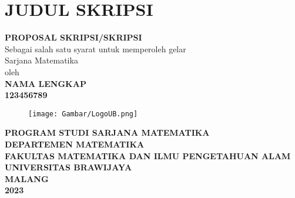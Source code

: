 
\chapter*{JUDUL SKRIPSI}
\begin{center}
	\vspace{1.0cm}
	{\textbf{PROPOSAL SKRIPSI/SKRIPSI{\huge}}}\\
	\vspace{0.5cm}
	Sebagai salah satu syarat untuk memperoleh gelar\\Sarjana Matematika\\
	\vspace{0.5cm}
	oleh\\
	\textbf{NAMA LENGKAP}\\
	\textbf{123456789}\\
	
	\vspace{1.5cm}
	\begin{figure}[h]
		\centering
		\texttt{[image: Gambar/LogoUB.png]}
	\end{figure}
	
	\vfill
	{\textbf{PROGRAM STUDI SARJANA MATEMATIKA}}\\
	{\textbf{DEPARTEMEN MATEMATIKA}}\\
	{\fontsize{10.5pt}{0.ex} \textbf{FAKULTAS MATEMATIKA DAN ILMU PENGETAHUAN ALAM}}\\
	{\textbf{UNIVERSITAS BRAWIJAYA}}\\
	{\textbf{MALANG}}\\
	{\textbf{2023}}\\
\end{center}
\cleardoublepage

